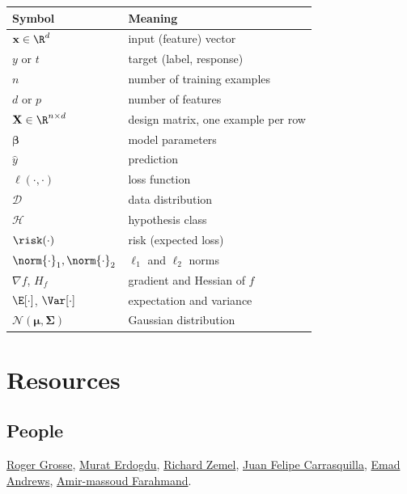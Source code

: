 \documentclass[a4paper, 12pt]{book}
\begin{document}
\begin{center}
\renewcommand{\arraystretch}{1.25}
\begin{tabular}{ll}
\toprule
Symbol & Meaning \\
\midrule
$\mathbf{x} \in \R^d$ & input (feature) vector \\
$y$ or $t$ & target (label, response) \\
$n$ & number of training examples \\
$d$ or $p$ & number of features \\
$\mathbf{X} \in \R^{n \times d}$ & design matrix, one example per row \\
$\boldsymbol{\beta}$ & model parameters \\
$\hat{y}$ & prediction \\
$\ell(\cdot,\cdot)$ & loss function \\
$\mathcal{D}$ & data distribution \\
$\mathcal{H}$ & hypothesis class \\
$\risk(\cdot)$ & risk (expected loss) \\
$\norm{\cdot}_1, \norm{\cdot}_2$ & $\ell_1$ and $\ell_2$ norms \\
$\nabla f$, $H_f$ & gradient and Hessian of $f$ \\
$\E[\cdot]$, $\Var[\cdot]$ & expectation and variance \\
$\mathcal{N}(\boldsymbol{\mu},\boldsymbol{\Sigma})$ & Gaussian distribution \\
\bottomrule
\end{tabular}
\end{center}

\mainmatter

\chapter{Resources}
\label{ch:resources}

\section{People}

\href{https://www.cs.toronto.edu/~rgrosse/}{Roger Grosse}, \href{https://www.cs.toronto.edu/~murat/}{Murat Erdogdu}, \href{https://www.cs.toronto.edu/~zemel/}{Richard Zemel}, \href{https://www.cs.toronto.edu/~juan/}{Juan Felipe Carrasquilla}, \href{https://www.cs.toronto.edu/~emad/}{Emad Andrews}, \href{https://www.cs.toronto.edu/~amir/}{Amir-massoud Farahmand}.
\end{document}
